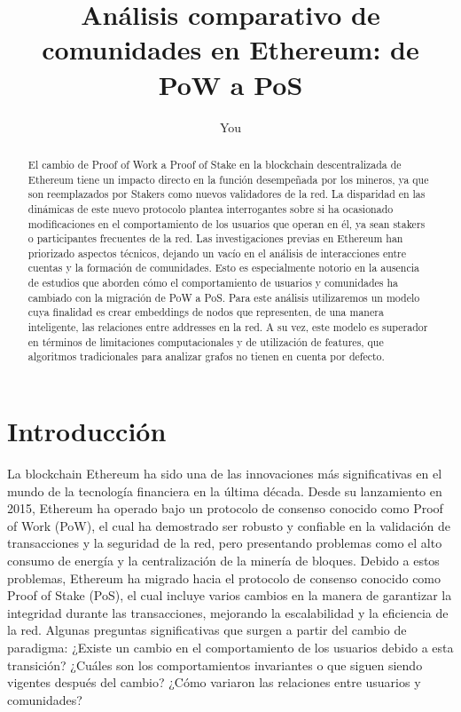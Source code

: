 \documentclass{article}
\title{Análisis comparativo de comunidades en Ethereum: de PoW a PoS}
\author{You}
\begin{document}
\maketitle

\begin{abstract}
El cambio de Proof of Work a Proof of Stake en la blockchain descentralizada de Ethereum tiene un impacto directo en la función desempeñada por los mineros, ya que son reemplazados por Stakers como nuevos validadores de la red. La disparidad en las dinámicas de este nuevo protocolo plantea interrogantes sobre si ha ocasionado modificaciones en el comportamiento de los usuarios que operan en él, ya sean stakers o participantes frecuentes de la red.
Las investigaciones previas en Ethereum han priorizado aspectos técnicos, dejando un vacío en el análisis de interacciones entre cuentas y la formación de comunidades. Esto es especialmente notorio en la ausencia de estudios que aborden cómo el comportamiento de usuarios y comunidades ha cambiado con la migración de PoW a PoS.
Para este análisis utilizaremos un modelo cuya finalidad es crear embeddings de nodos que representen, de una manera inteligente, las relaciones entre addresses en la red. A su vez, este modelo es superador en términos de limitaciones computacionales y de utilización de features, que algoritmos tradicionales para analizar grafos no tienen en cuenta por defecto.

\end{abstract}

\section{Introducción}

La blockchain Ethereum ha sido una de las innovaciones más significativas en el mundo de la tecnología financiera en la última década. Desde su lanzamiento en 2015, Ethereum ha operado bajo un protocolo de consenso conocido como Proof of Work (PoW), el cual ha demostrado ser robusto y confiable en la validación de transacciones y la seguridad de la red, pero presentando problemas como el alto consumo de energía y la centralización de la minería de bloques. Debido a estos problemas, Ethereum ha migrado hacia el protocolo de consenso conocido como Proof of Stake (PoS), el cual incluye varios cambios en la manera de garantizar la integridad durante las transacciones, mejorando la escalabilidad y la eficiencia de la red.
Algunas preguntas significativas que surgen a partir del cambio de paradigma: ¿Existe un cambio en el comportamiento de los usuarios debido a esta transición? ¿Cuáles son los comportamientos invariantes o que siguen siendo vigentes después del cambio? ¿Cómo variaron las relaciones entre usuarios y comunidades?
\end{document}
